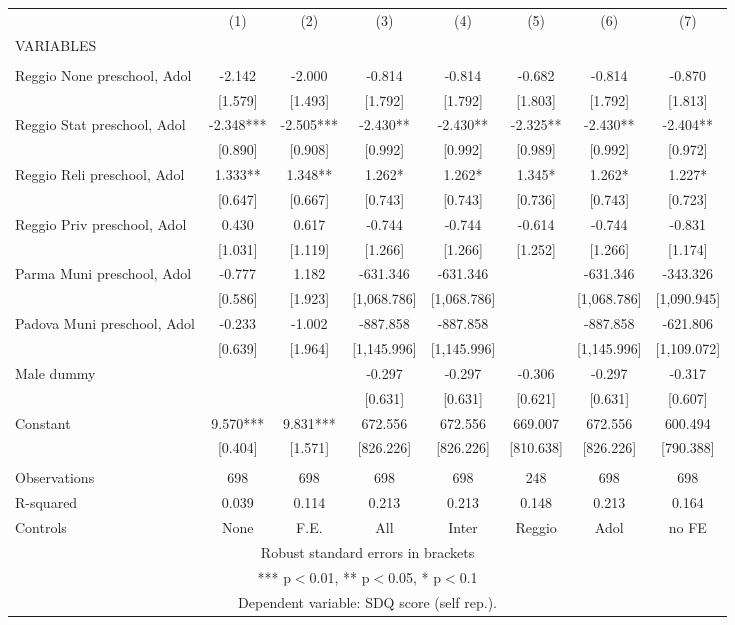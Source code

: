 \begin{tabular}{lccccccc} \hline
 & (1) & (2) & (3) & (4) & (5) & (6) & (7) \\
VARIABLES &  &  &  &  &  &  &  \\ \hline
 &  &  &  &  &  &  &  \\
Reggio None preschool, Adol & -2.142 & -2.000 & -0.814 & -0.814 & -0.682 & -0.814 & -0.870 \\
 & [1.579] & [1.493] & [1.792] & [1.792] & [1.803] & [1.792] & [1.813] \\
Reggio Stat preschool, Adol & -2.348*** & -2.505*** & -2.430** & -2.430** & -2.325** & -2.430** & -2.404** \\
 & [0.890] & [0.908] & [0.992] & [0.992] & [0.989] & [0.992] & [0.972] \\
Reggio Reli preschool, Adol & 1.333** & 1.348** & 1.262* & 1.262* & 1.345* & 1.262* & 1.227* \\
 & [0.647] & [0.667] & [0.743] & [0.743] & [0.736] & [0.743] & [0.723] \\
Reggio Priv preschool, Adol & 0.430 & 0.617 & -0.744 & -0.744 & -0.614 & -0.744 & -0.831 \\
 & [1.031] & [1.119] & [1.266] & [1.266] & [1.252] & [1.266] & [1.174] \\
Parma Muni preschool, Adol & -0.777 & 1.182 & -631.346 & -631.346 &  & -631.346 & -343.326 \\
 & [0.586] & [1.923] & [1,068.786] & [1,068.786] &  & [1,068.786] & [1,090.945] \\
Padova Muni preschool, Adol & -0.233 & -1.002 & -887.858 & -887.858 &  & -887.858 & -621.806 \\
 & [0.639] & [1.964] & [1,145.996] & [1,145.996] &  & [1,145.996] & [1,109.072] \\
Male dummy &  &  & -0.297 & -0.297 & -0.306 & -0.297 & -0.317 \\
 &  &  & [0.631] & [0.631] & [0.621] & [0.631] & [0.607] \\
Constant & 9.570*** & 9.831*** & 672.556 & 672.556 & 669.007 & 672.556 & 600.494 \\
 & [0.404] & [1.571] & [826.226] & [826.226] & [810.638] & [826.226] & [790.388] \\
 &  &  &  &  &  &  &  \\
Observations & 698 & 698 & 698 & 698 & 248 & 698 & 698 \\
R-squared & 0.039 & 0.114 & 0.213 & 0.213 & 0.148 & 0.213 & 0.164 \\
 Controls & None & F.E. & All & Inter & Reggio & Adol & no FE \\ \hline
\multicolumn{8}{c}{ Robust standard errors in brackets} \\
\multicolumn{8}{c}{ *** p$<$0.01, ** p$<$0.05, * p$<$0.1} \\
\multicolumn{8}{c}{ Dependent variable: SDQ score (self rep.).} \\
\end{tabular}
